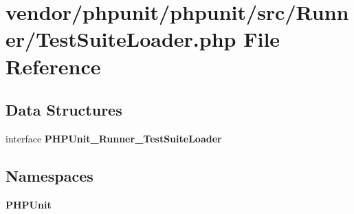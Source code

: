\section{vendor/phpunit/phpunit/src/\+Runner/\+Test\+Suite\+Loader.php File Reference}
\label{_test_suite_loader_8php}
\subsection*{Data Structures}
\begin{DoxyCompactItemize}
\item 
interface {\bf P\+H\+P\+Unit\+\_\+\+Runner\+\_\+\+Test\+Suite\+Loader}
\end{DoxyCompactItemize}
\subsection*{Namespaces}
\begin{DoxyCompactItemize}
\item 
 {\bf P\+H\+P\+Unit}
\end{DoxyCompactItemize}
